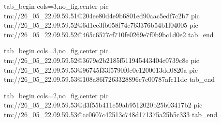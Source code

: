  
 
 
 
 

\qqSecCmtScr


\ifcmt
  tab_begin cols=3,no_fig,center
 pic tm://26_05_22.09.59.51@204ee80d4e9b6801ed90aac5edf7c2b7
 pic tm://26_05_22.09.59.52@6d1ee3fb058f74c763376b54b1f04005
 pic tm://26_05_22.09.59.52@465c6577cf710fe0269e7f0b9bc1d0e2
  tab_end
\fi


\ifcmt
  tab_begin cols=3,no_fig,center
 pic tm://26_05_22.09.59.52@3679e2b2185f511945443404c0739c8e
 pic tm://26_05_22.09.59.53@96745f33f5790f0e0c1200013dd0820a
 pic tm://26_05_22.09.59.53@108a86f7263328896c7c00787afc11dc
  tab_end
\fi


\ifcmt
  tab_begin cols=2,no_fig,center
 pic tm://26_05_22.09.59.53@d3f55b411e59ab9512020b25b03417b2
 pic tm://26_05_22.09.59.53@cc0607c42513c748d171375a25b5c333
  tab_end
\fi

